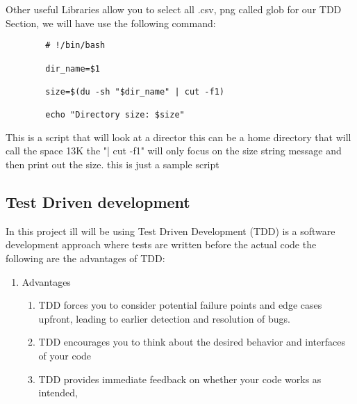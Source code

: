	Other useful Libraries allow you to  select all  .csv, png  called glob
	for our TDD Section, we will have  use the  following command:
	\label{TDD sample bash}
	\begin{verbatim}
		# !/bin/bash

		dir_name=$1

		size=$(du -sh "$dir_name" | cut -f1)

		echo "Directory size: $size"
	\end{verbatim}
	This is a script that will look at a  director this can be a home directory that will call the  space 13K
	the "| cut -f1" will only focus on the size string message and then print out the size. this is  just  a sample  script 
	\subsection{Test Driven development}
	In this  project ill will be using  Test Driven Development (TDD) is a software development approach where tests are written before the actual code
	the following are the advantages of TDD:
	\begin{enumerate}
		\item Advantages
		\begin{enumerate}
			\item TDD forces you to consider potential failure points and edge cases upfront, leading to earlier detection and resolution of bugs.
			\item TDD encourages you to think about the desired behavior and interfaces of your code
			\item TDD provides immediate feedback on whether your code works as intended,
		\end{enumerate}
	\end{enumerate}


